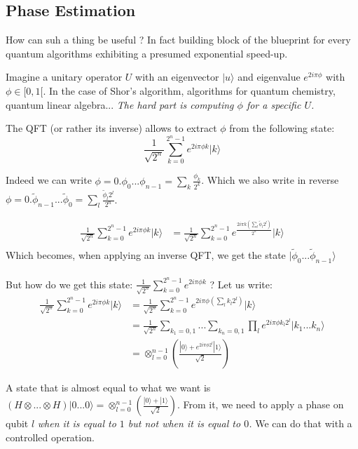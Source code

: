 \documentclass{article}
\begin{document}
\subsection{Phase Estimation}

How can suh a thing be useful ? In fact building block of the blueprint for every 
quantum algorithms exhibiting a presumed exponential speed-up.

Imagine a unitary operator $U$ with an eigenvector $|u\rangle$ and
eigenvalue $e^{2i\pi \phi}$ with $\phi\in[0,1[$. In the case of Shor's algorithm,
algorithms for quantum chemistry, quantum linear algebra... \emph{The hard part is 
computing $\phi$ for a specific $U$.}

The QFT (or rather its inverse) allows to extract $\phi$ from the following state:
$$\frac{1}{\sqrt{2^n}}\sum_{k=0}^{2^n-1} e^{2i\pi\phi k}  |k\rangle$$

Indeed we can write $\phi=0.\phi_0...\phi_{n-1}=\sum_{k}\frac{\phi_k}{2^k}$.
Which we also write in reverse $\phi=0.\tilde{\phi}_{n-1}...\tilde{\phi}_0=
\sum_{l}\frac{\tilde{\phi}_l 2^l}{2^n}$.

\begin{align*}
  \frac{1}{\sqrt{2^n}}  \sum_{k=0}^{2^n-1} e^{2i\pi\phi k}  |k\rangle &= \frac{1}{\sqrt{2^n}}\sum_{k=0}^{2^n-1} e^{\frac{2i\pi k \left(\sum_l{\tilde{\phi}_l 2^l}\right)}{2^n} }  |k\rangle \\ 
\end{align*}
Which becomes, when applying an inverse QFT, we get the state $|\tilde{\phi}_0...\tilde{\phi}_{n-1}\rangle$

\paragraph{} But how do we get this state: $\frac{1}{\sqrt{2^n}}\sum_{k=0}^{2^n-1} e^{2i\pi\phi k} $ ? 
Let us write:
\begin{align*}
 \frac{1}{\sqrt{2^n}}   \sum_{k=0}^{2^n-1} e^{2i\pi\phi k} |k\rangle &= \frac{1}{\sqrt{2^n}} \sum_{k=0}^{2^n-1} e^{2i\pi\phi \left(\sum_{l} k_l 2^l\right)} |k\rangle \\
    &= \frac{1}{\sqrt{2^n}}\sum_{k_1=0,1}...\sum_{k_n=0,1} \prod_{l} e^{2i\pi\phi k_l 2^l} |k_1...k_n\rangle \\
    &= \otimes_{l=0}^{n-1} \left(\frac{|0\rangle+e^{2i\pi\phi 2^l}|1\rangle}{\sqrt{2}}\right)
\end{align*}

A state that is almost equal to what we want is $\left(H\otimes ... \otimes H\right) |0...0\rangle = \otimes_{l=0}^{n-1} \left(\frac{|0\rangle+|1\rangle}{\sqrt{2}}\right)$. From it, we need to apply a phase on qubit $l$ \emph{when it is equal to $1$ but not when it is equal to $0$.} We can do that with a controlled operation.
\end{document}
